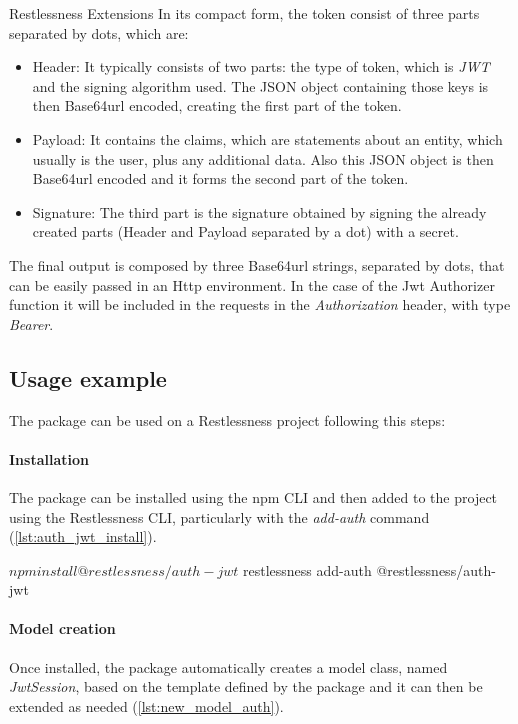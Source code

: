 \begin{chapter}{Restlessness Extensions}
    \noindent
    In its compact form, the token consist of three parts separated by dots,
    which are:
    \begin{itemize}
        \item Header: It typically consists of two parts: the type of token, which
            is \textit{JWT} and the signing algorithm used. The JSON object
            containing those keys is then Base64url encoded, creating the first
            part of the token.
        \item Payload: It contains the claims, which are statements about an entity,
            which usually is the user, plus any additional data. Also this JSON
            object is then Base64url encoded and it forms the second part of the token.
        \item Signature: The third part is the signature obtained by signing the
            already created parts (Header and Payload separated by a dot) with a
            secret.
    \end{itemize}
    The final output is composed by three Base64url strings, separated by dots,
    that can be easily passed in an Http environment. In the case of the Jwt
    Authorizer function it will be included in the requests in the
    \textit{Authorization} header, with type \textit{Bearer}.

    \subsection{Usage example}
    The package can be used on a Restlessness project following this steps:

    \paragraph{Installation}
    The package can be installed using the npm CLI and then added to the project
    using the Restlessness CLI, particularly with the \textit{add-auth} command
    (\ref{lst:auth_jwt_install}).

    \bigskip
    \begin{code}[caption=auth-jwt installation, label={lst:auth_jwt_install},  language=shell]
$ npm install @restlessness/auth-jwt
$ restlessness add-auth @restlessness/auth-jwt
    \end{code}

    \paragraph{Model creation}
    Once installed, the package automatically creates a model class, named
    \textit{JwtSession}, based on the template defined by the package and it can
    then be extended as needed (\ref{lst:new_model_auth}).


\end{chapter}
